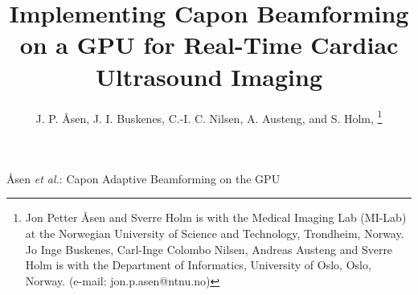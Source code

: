 \documentclass[journal]{IEEEtran}
\begin{document}
%
\title{Implementing Capon Beamforming on a GPU for Real-Time Cardiac Ultrasound Imaging}
%
%
%

\author{J. P. \AA{}sen,  J. I. Buskenes, C.-I. C. Nilsen,  A. Austeng,  and S. Holm,  %
\thanks{Jon Petter \AA{}sen and Sverre Holm is with the Medical Imaging Lab (MI-Lab) at the Norwegian University of Science and Technology, Trondheim, Norway. Jo Inge Buskenes, Carl-Inge Colombo Nilsen, Andreas Austeng and Sverre Holm is with the Department of Informatics, University of Oslo, Oslo, Norway. (e-mail: jon.p.asen@ntnu.no)} 
}


% 
%



%
{\AA{}sen \MakeLowercase{\textit{et al.}}: Capon Adaptive Beamforming on the GPU}
% 
\end{document}
